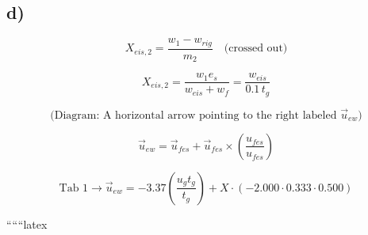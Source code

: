 

\subsection*{d)}

\[
X_{eis,2} = \frac{w_1 - w_{rig}}{m_2} \quad \text{(crossed out)}
\]

\[
X_{eis,2} = \frac{w_{1} e_{s}}{w_{eis} + w_{f}} = \frac{w_{eis}}{0.1 \, t_{g}}
\]

\[
\text{(Diagram: A horizontal arrow pointing to the right labeled } \vec{u}_{ew})
\]

\[
\vec{u}_{ew} = \vec{u}_{fes} + \vec{u}_{fes} \times \left( \frac{u_{fes}}{u_{fes}} \right)
\]

\[
\text{Tab 1} \rightarrow \vec{u}_{ew} = -3.37 \left( \frac{u_{g} t_{g}}{t_{g}} \right) + X \cdot \left( -2.000 \cdot 0.333 \cdot 0.500 \right)
\]

``````latex